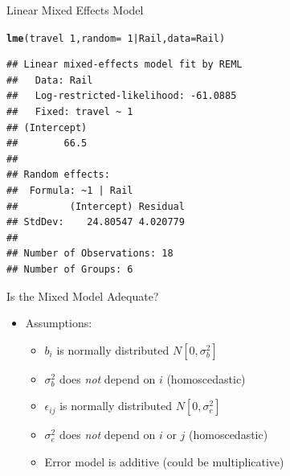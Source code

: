 \documentclass[xcolor=x11names,compress]{beamer}\usepackage[]{graphicx}\usepackage[]{color}
\makeatletter
\newcommand{\hlnum}[1]{\textcolor[rgb]{0.686,0.059,0.569}{#1}}%
\newcommand{\hlopt}[1]{\textcolor[rgb]{0,0,0}{#1}}%
\newcommand{\hlstd}[1]{\textcolor[rgb]{0.345,0.345,0.345}{#1}}%
\newcommand{\hlkwc}[1]{\textcolor[rgb]{0.333,0.667,0.333}{#1}}%
\newcommand{\hlkwd}[1]{\textcolor[rgb]{0.737,0.353,0.396}{\textbf{#1}}}%
\newenvironment{kframe}{%
 \def\at@end@of@kframe{}%
 \ifinner\ifhmode%
  \def\at@end@of@kframe{\end{minipage}}%
  \begin{minipage}{\columnwidth}%
 \fi\fi%
 \def\FrameCommand##1{\hskip\@totalleftmargin \hskip-\fboxsep
 \colorbox{shadecolor}{##1}\hskip-\fboxsep
     \hskip-\linewidth \hskip-\@totalleftmargin \hskip\columnwidth}%
 \MakeFramed {\advance\hsize-\width
   \@totalleftmargin\z@ \linewidth\hsize
   \@setminipage}}%
 {\par\unskip\endMakeFramed%
 \at@end@of@kframe}
\newenvironment{knitrout}{}{} %
\makeatother
\begin{document}
\begin{frame}[fragile]{Linear Mixed Effects Model}
\begin{knitrout}\tiny
{}\color{fgcolor}\begin{kframe}
\begin{alltt}
\hlkwd{lme}\hlstd{(travel}\hlopt{~}\hlnum{1}\hlstd{,}\hlkwc{random}\hlstd{=}\hlopt{~}\hlnum{1}\hlopt{|}\hlstd{Rail,}\hlkwc{data}\hlstd{=Rail)}
\end{alltt}
\begin{verbatim}
## Linear mixed-effects model fit by REML
##   Data: Rail 
##   Log-restricted-likelihood: -61.0885
##   Fixed: travel ~ 1 
## (Intercept) 
##        66.5 
## 
## Random effects:
##  Formula: ~1 | Rail
##         (Intercept) Residual
## StdDev:    24.80547 4.020779
## 
## Number of Observations: 18
## Number of Groups: 6
\end{verbatim}
\end{kframe}
\end{knitrout}
\end{frame}


\begin{frame}[fragile]{Is the Mixed Model Adequate?}
  \begin{itemize}
  \item Assumptions:
    \begin{itemize}
    \item $b_i$ is normally distributed $N[0,\sigma^2_b]$
    \item $\sigma^2_b$ does {\it not} depend on $i$ (homoscedastic) 
    \item $\epsilon_{ij}$ is normally distributed $N[0,\sigma^2_e]$
    \item $\sigma^2_e$ does {\it not} depend on $i$ or $j$ (homoscedastic)
    \item Error model is additive (could be multiplicative)
    \end{itemize}
  \end{itemize}
\end{frame}
\end{document}
